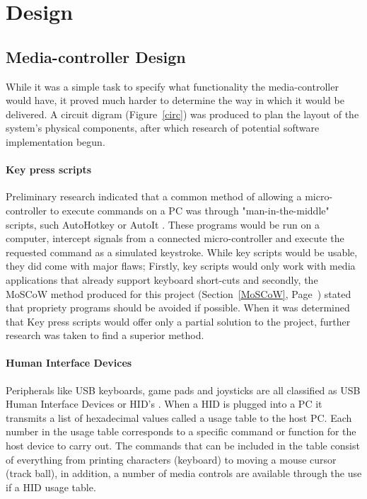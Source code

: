 \documentclass{article}
\begin{document}
	\section{Design}
		\subsection{Media-controller Design}
			While it was a simple task to specify what functionality the media-controller would have, it proved much harder to determine the way in which it would be delivered. A circuit digram (Figure~\ref{circ}) was produced to plan the layout of the system's  physical components, after which research of potential software implementation begun.
			
			\paragraph{Key press scripts}
			Preliminary research indicated that a common method of allowing a micro-controller to execute commands on a PC was through "man-in-the-middle" scripts, such AutoHotkey \cite{AutoHotkey:online} or AutoIt \cite{AutoIt:online}. These programs would be run on a computer, intercept signals from a connected micro-controller and execute the requested command as a simulated keystroke.
			While key scripts would be usable, they did come with major flaws; Firstly, key scripts would only work with media applications that already support keyboard short-cuts and secondly, the MoSCoW method produced for this project (Section~\ref{MoSCoW}, Page~\pageref{MoSCoW}) stated that propriety programs should be avoided if possible.
			When it was determined that Key press scripts would offer only a partial solution to the project, further research was taken to find a superior method.
			
			\paragraph{Human Interface Devices}
			Peripherals like USB keyboards, game pads and joysticks are all classified as USB Human Interface Devices or HID's \cite{HID:online} \cite{HIDSiliconLab:online}. When a HID is plugged into a PC it transmits a list of hexadecimal values called a usage table to the host PC. Each number in the usage table corresponds to a specific command or function for the host device to carry out. The commands that can be included in the table consist of everything from printing characters (keyboard) to moving a mouse cursor (track ball), in addition, a number of media controls are available through the use if a HID usage table. 
							
\end{document}
